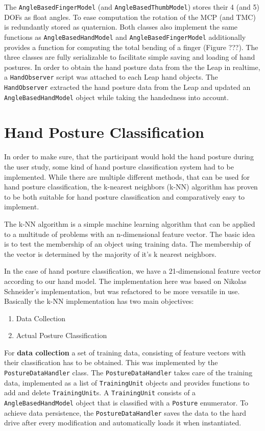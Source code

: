 The \texttt{AngleBasedFingerModel} (and \texttt{AngleBasedThumbModel}) stores their 4 (and 5) DOFs as float angles. To ease computation the rotation of the MCP (and TMC) is redundantly stored as quaternion. Both classes also implement the same functions as \texttt{AngleBasedHandModel} and \texttt{AngleBasedFingerModel} additionally provides a function for computing the total bending of a finger (\textcolor[rgb]{1,0,0}{Figure ???}). The three classes are fully serializable to facilitate simple saving and loading of hand postures.
In order to obtain the hand posture data from the the Leap in realtime, a \texttt{HandObserver} script was attached to each Leap hand objects. The \texttt{HandObserver} extracted the hand posture data from the Leap and updated an \texttt{AngleBasedHandModel} object while taking the handedness into account.

\section{Hand Posture Classification}

In order to make sure, that the participant would hold the hand posture during the user study, some kind of hand posture classification system had to be implemented. While there are multiple different methods, that can be used for hand posture classification, the k-nearest neighbors (k-NN) algorithm has proven to be both suitable for hand posture classification and comparatively easy to implement. 

The k-NN algorithm is a simple machine learning algorithm that can be applied to a multitude of problems with an n-dimensional feature vector. The basic idea is to test the membership of an object using training data. The membership of the vector is determined by the majority of it's k nearest neighbors. 

In the case of hand posture classification, we have a 21-dimensional feature vector according to our hand model. The implementation here was based on Nikolas Schneider's implementation, but was refactored to be more versatile in use. Basically the k-NN implementation has two main objectives:

\begin{enumerate}
	\item Data Collection
	\item Actual Posture Classification
\end{enumerate}

For \textbf{data collection} a set of training data, consisting of feature vectors with their classification has to be obtained. This was implemented by the \texttt{PostureDataHandler} class. The \texttt{PostureDataHandler} takes care of the training data, implemented as a list of \texttt{TrainingUnit} objects and provides functions to add and delete \texttt{TrainingUnit}s. A \texttt{TrainingUnit} consists of a \texttt{AngleBasedHandModel} object that is classified with a \texttt{Posture} enumerator. To achieve data persistence, the \texttt{PostureDataHandler} saves the data to the hard drive after every modification and automatically loads it when instantiated.

